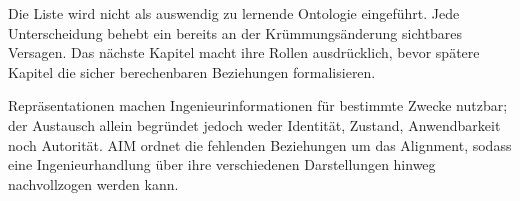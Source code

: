 Die Liste wird nicht als auswendig zu lernende Ontologie eingeführt. Jede
Unterscheidung behebt ein bereits an der Krümmungsänderung sichtbares Versagen.
Das nächste Kapitel macht ihre Rollen ausdrücklich, bevor spätere Kapitel die
sicher berechenbaren Beziehungen formalisieren.

\begin{summary}
Repräsentationen machen Ingenieurinformationen für bestimmte Zwecke nutzbar;
der Austausch allein begründet jedoch weder Identität, Zustand,
Anwendbarkeit noch Autorität. AIM ordnet die fehlenden Beziehungen um das
Alignment, sodass eine Ingenieurhandlung über ihre verschiedenen Darstellungen
hinweg nachvollzogen werden kann.
\end{summary}
